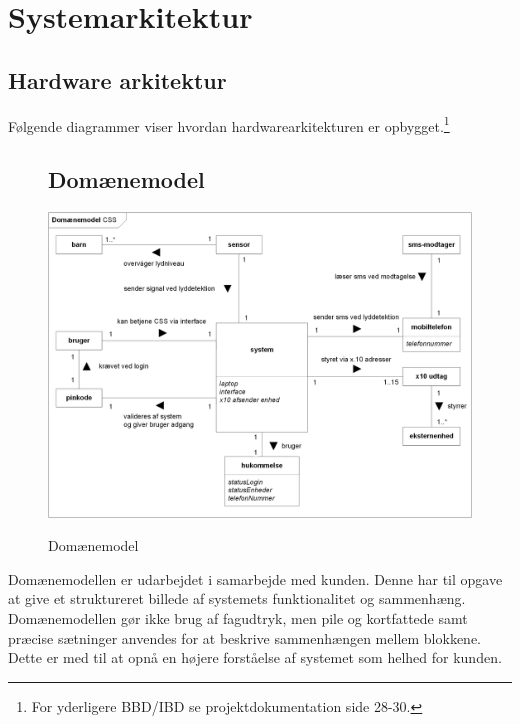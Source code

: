 \chapter{Systemarkitektur}

\section{Hardware arkitektur}

Følgende diagrammer viser hvordan hardwarearkitekturen er opbygget.\footnote{For yderligere BBD/IBD se projektdokumentation side 28-30.}

\begin{figure}[htbp] \centering
\section{Domænemodel}
{\includegraphics[width=\textwidth]{billeder/diagrammer/Domain_Model}}
\caption{Domænemodel}
\label{lab:domainmodel}
\end{figure}
Domænemodellen er udarbejdet i samarbejde med kunden. Denne har til opgave at give et struktureret billede af systemets funktionalitet og sammenhæng. Domænemodellen gør ikke brug af fagudtryk, men pile og kortfattede samt præcise sætninger anvendes for at beskrive sammenhængen mellem blokkene. Dette er med til at opnå en højere forståelse af systemet som helhed for kunden.

\newpage

